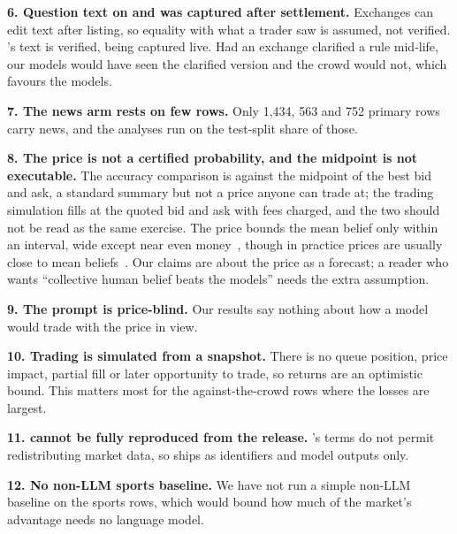 \textbf{6. Question text on \winB and \winC was captured after settlement.}
Exchanges can edit text after listing, so equality with what a trader saw is
assumed, not verified. \winA's text is verified, being captured live. Had an
exchange clarified a rule mid-life, our models would have seen the clarified
version and the crowd would not, which favours the models.

\textbf{7. The news arm rests on few rows.} Only 1{,}434, 563 and 752 primary
rows carry news, and the analyses run on the test-split share of those.

\textbf{8. The price is not a certified probability, and the midpoint is not
executable.} The accuracy comparison is against the midpoint of the best bid and
ask, a standard summary but not a price anyone can trade at; the trading
simulation fills at the quoted bid and ask with fees charged, and the two should
not be read as the same exercise. The price bounds the mean belief only
within an interval, wide except near even money~\citep{manski2006}, though in
practice prices are usually close to mean beliefs~\citep{wolfers2006}. Our
claims are about the price as a forecast; a reader who wants ``collective human
belief beats the models'' needs the extra assumption.

\textbf{9. The prompt is price-blind.} Our results say nothing about how a model
would trade with the price in view.

\textbf{10. Trading is simulated from a snapshot.} There is no queue position,
price impact, partial fill or later opportunity to trade, so returns are an
optimistic bound. This matters most for the against-the-crowd rows where the
losses are largest.

\textbf{11. \winC cannot be fully reproduced from the release.} \kalshi's terms do
not permit redistributing market data, so \winC ships as identifiers and model
outputs only.

\textbf{12. No non-LLM sports baseline.} We have not run a simple non-LLM
baseline on the sports rows, which would bound how much of the market's advantage
needs no language model.
